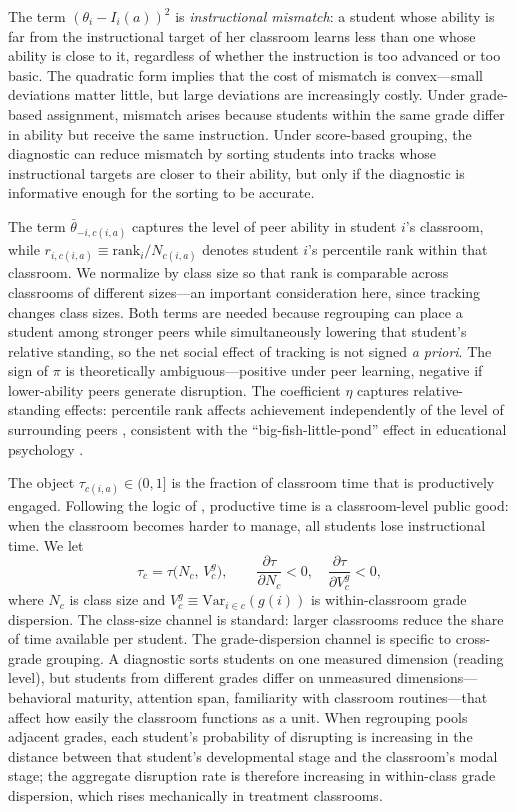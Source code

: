 \documentclass[11pt]{article}
\begin{document}
The term $(\theta_i - I_i(a))^2$ is \emph{instructional mismatch}: a student whose ability is far from the instructional target of her classroom learns less than one whose ability is close to it, regardless of whether the instruction is too advanced or too basic. The quadratic form implies that the cost of mismatch is convex---small deviations matter little, but large deviations are increasingly costly. Under grade-based assignment, mismatch arises because students within the same grade differ in ability but receive the same instruction. Under score-based grouping, the diagnostic can reduce mismatch by sorting students into tracks whose instructional targets are closer to their ability, but only if the diagnostic is informative enough for the sorting to be accurate.

The term $\bar{\theta}_{-i,c(i,a)}$ captures the level of peer ability in student $i$'s classroom, while $r_{i,c(i,a)} \equiv \text{rank}_i / N_{c(i,a)}$ denotes student $i$'s percentile rank within that classroom. We normalize by class size so that rank is comparable across classrooms of different sizes---an important consideration here, since tracking changes class sizes. Both terms are needed because regrouping can place a student among stronger peers while simultaneously lowering that student's relative standing, so the net social effect of tracking is not signed \emph{a priori}. The sign of $\pi$ is theoretically ambiguous---positive under peer learning, negative if lower-ability peers generate disruption. The coefficient $\eta$ captures relative-standing effects: percentile rank affects achievement independently of the level of surrounding peers \citep{murphy2020top, elsner2021rank}, consistent with the ``big-fish-little-pond'' effect in educational psychology \citep{hoxby2005taking}.

The object $\tau_{c(i,a)} \in (0, 1]$ is the fraction of classroom time that is productively engaged. Following the logic of \citet{Lazear2001}, productive time is a classroom-level public good: when the classroom becomes harder to manage, all students lose instructional time. We let
\begin{equation}
\label{eq:tau}
\tau_c = \tau\!\big(N_c,\, V^g_c\big), \qquad \frac{\partial\tau}{\partial N_c} < 0, \quad \frac{\partial\tau}{\partial V^g_c} < 0,
\end{equation}
where $N_c$ is class size and $V^g_c \equiv \text{Var}_{i \in c}(g(i))$ is within-classroom grade dispersion. The class-size channel is standard: larger classrooms reduce the share of time available per student. The grade-dispersion channel is specific to cross-grade grouping. A diagnostic sorts students on one measured dimension (reading level), but students from different grades differ on unmeasured dimensions---behavioral maturity, attention span, familiarity with classroom routines---that affect how easily the classroom functions as a unit. When regrouping pools adjacent grades, each student's probability of disrupting is increasing in the distance between that student's developmental stage and the classroom's modal stage; the aggregate disruption rate is therefore increasing in within-class grade dispersion, which rises mechanically in treatment classrooms.
\end{document}
